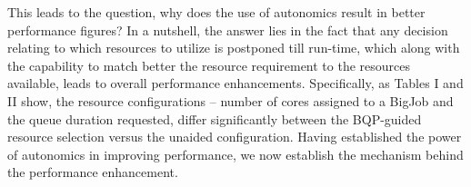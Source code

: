 \documentclass{sig-alternate}
\newcommand{\up}{\vspace*{-0.3em}}
\begin{document}
\begin{table}
\caption{A table with the results for the configurations used
  on Ranger with and without BQP. Notice how the use
  of BQP has small but significant changes in the queue, size and duration
  of the BigJob changes. }\up\up\up\up\up\up\up\up\up\up\up\up
\end{table}

This leads to the question, why does the use of autonomics result in
better performance figures? In a nutshell, the answer lies in the fact
that any decision relating to which resources to utilize is postponed
till run-time, which along with the capability to match better the
resource requirement to the resources available, leads to overall
performance enhancements. Specifically, as Tables I and II show, the
resource configurations -- number of cores assigned to a BigJob and
the queue duration requested, differ significantly between the
BQP-guided resource selection versus the unaided configuration.
Having established the power of autonomics in improving performance,
we now establish the mechanism behind the performance enhancement.
\end{document}

